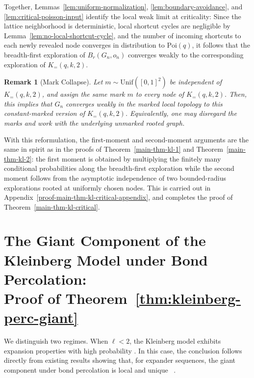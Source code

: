 \documentclass[10pt]{amsart}
\newtheorem{remark}[theorem]{Remark}
\begin{document}
Together, Lemmas~\ref{lem:uniform-normalization}, \ref{lem:boundary-avoidance}, and \ref{lem:critical-poisson-input} identify the local weak limit at criticality: Since the lattice neighborhood is deterministic, local shortcut cycles are negligible by Lemma~\ref{lem:no-local-shortcut-cycle}, and the number of incoming shortcuts to each newly revealed node converges in distribution to \(\mathrm{Poi}(q)\), it follows that the breadth-first exploration of \(B_r(G_n,o_n)\) converges weakly to the corresponding exploration of \(K_{=}(q,k,2)\).

\begin{remark}[Mark Collapse]\label{rem:critical-mark-collapse}
Let \(m\sim \mathrm{Unif}([0,1]^2)\) be independent of \(K_{=}(q,k,2)\), and assign the same mark \(m\) to every node of \(K_{=}(q,k,2)\). Then, this implies that \(G_n\) converges weakly in the marked local topology to this constant-marked version of \(K_{=}(q,k,2)\). Equivalently, one may disregard the marks and work with the underlying unmarked rooted graph.
\end{remark}

With this reformulation, the first-moment and second-moment arguments are the same in spirit as in the proofs of Theorem~\ref{main-thm-kl-1} and Theorem~\ref{main-thm-kl-2}: the first moment is obtained by multiplying the finitely many conditional probabilities along the breadth-first exploration while the second moment follows from the asymptotic independence of two bounded-radius explorations rooted at uniformly chosen nodes. This is carried out in Appendix~\ref{proof-main-thm-kl-critical-appendix}, and completes the proof of Theorem~\ref{main-thm-kl-critical}.


\section{The Giant Component of the Kleinberg Model under Bond Percolation: \\Proof of Theorem~\ref{thm:kleinberg-perc-giant}} \label{proof-applications-epidemic}

We distinguish two regimes.
When $\ell<2$, the Kleinberg model exhibits expansion properties with high probability \cite{flaxman}.
In this case, the conclusion follows directly from existing results showing that, for expander
sequences, the giant component under bond percolation is local and unique
~\cite{yeganeh-digraph}.
\end{document}
